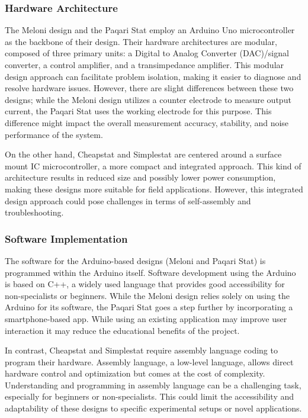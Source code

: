 \documentclass{article}
\begin{document}
\subsubsection*{Hardware Architecture}
The Meloni design and the Paqari Stat employ an Arduino Uno microcontroller as the backbone of their design. Their hardware architectures are modular, composed of three primary units: a Digital to Analog Converter (DAC)/signal converter, a control amplifier, and a transimpedance amplifier. This modular design approach can facilitate problem isolation, making it easier to diagnose and resolve hardware issues. However, there are slight differences between these two designs; while the Meloni design utilizes a counter electrode to measure output current, the Paqari Stat uses the working electrode for this purpose. This difference might impact the overall measurement accuracy, stability, and noise performance of the system.


On the other hand, Cheapstat and Simplestat are centered around a surface mount IC microcontroller, a more compact and integrated approach. This kind of architecture results in reduced size and possibly lower power consumption, making these designs more suitable for field applications. However, this integrated design approach could pose challenges in terms of self-assembly and troubleshooting.


\subsubsection*{Software Implementation}
The software for the Arduino-based designs (Meloni and Paqari Stat) is programmed within the Arduino itself. Software development using the Arduino is based on C++, a widely used language that provides good accessibility for non-specialists or beginners. While the Meloni design relies solely on using the Arduino for its software, the Paqari Stat goes a step further by incorporating a smartphone-based app. While using an existing application may improve user interaction it may reduce the educational benefits of the project.


In contrast, Cheapstat and Simplestat require assembly language coding to program their hardware. Assembly language, a low-level language, allows direct hardware control and optimization but comes at the cost of complexity. Understanding and programming in assembly language can be a challenging task, especially for beginners or non-specialists. This could limit the accessibility and adaptability of these designs to specific experimental setups or novel applications.
\end{document}

